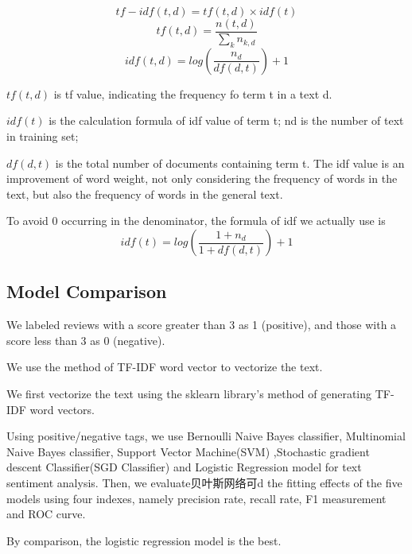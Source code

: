 \documentclass{mcmthesis}
\begin{document}
\begin{equation}
tf - idf(t,d)=tf(t,d) \times idf(t)
\end{equation}
\begin{equation}
tf(t,d)=\frac{n(t,d)}{\sum_k{n_{k,d}}}
\end{equation}
\begin{equation}
idf(t,d)=log(\frac{n_d}{df(d,t)})+1
\end{equation}

$tf(t, d)$ is tf value, indicating the frequency fo term t in a text d.

$idf(t)$ is the calculation formula of idf value of term t; nd is the number of text in training set;

$df(d, t)$ is the total number of documents containing term t. The idf value is an improvement
of word weight, not only considering the frequency of words in the text, but also the frequency
of words in the general text. 

To avoid 0 occurring in the denominator, the formula of idf we actually use is
\begin{equation}
idf(t)=log(\frac{1+n_d}{1+df(d,t)})+1
\end{equation}
\subsection{Model Comparison}

We labeled reviews with a score greater than 3 as 1 (positive), and those with a score less than 3 as 0 (negative).

We use the method of TF-IDF word vector to vectorize the text.

We first vectorize the text using the sklearn library's method of generating TF-IDF word vectors.

Using positive/negative tags, we use Bernoulli Naive Bayes classifier, Multinomial Naive Bayes classifier, Support Vector Machine(SVM) ,Stochastic gradient descent Classifier(SGD Classifier) and Logistic Regression model for text sentiment analysis.
Then, we evaluate贝叶斯网络可d the fitting effects of the five models using four indexes, namely precision rate, recall rate, F1 measurement and ROC curve.

By comparison, the logistic regression model is the best.
\end{document}
